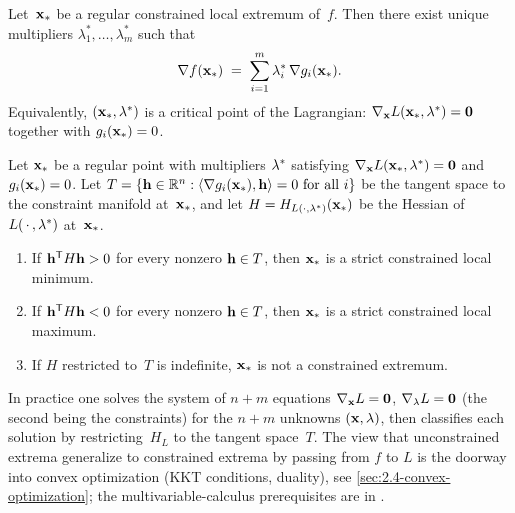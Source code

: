 \begin{theorem}
\label{thm:lagrange-necessary}
Let~$\mathbf{x}_*$ be a regular constrained local extremum of~$f$. Then
there exist unique multipliers $\lambda_1^*, \dots, \lambda_m^*$ such
that
\[
  \nabla f(\mathbf{x}_*) \;=\; \sum_{i=1}^{m} \lambda_i^*\, \nabla g_i(\mathbf{x}_*).
\]
Equivalently, $(\mathbf{x}_*, \mathbf{\lambda}^*)$ is a critical point of
the Lagrangian: $\nabla_{\mathbf{x}} L(\mathbf{x}_*, \mathbf{\lambda}^*) = \mathbf{0}$
together with $g_i(\mathbf{x}_*) = 0$.
\end{theorem}

\begin{theorem}
\label{thm:lagrange-sufficient}
Let $\mathbf{x}_*$ be a regular point with multipliers $\mathbf{\lambda}^*$
satisfying $\nabla_{\mathbf{x}} L(\mathbf{x}_*, \mathbf{\lambda}^*) = \mathbf{0}$
and $g_i(\mathbf{x}_*) = 0$. Let $T = \{\mathbf{h} \in \mathbb{R}^n : \langle \nabla g_i(\mathbf{x}_*), \mathbf{h} \rangle = 0
\text{ for all } i\}$ be the tangent space to the constraint manifold
at~$\mathbf{x}_*$, and let $H = H_{L(\cdot, \mathbf{\lambda}^*)}(\mathbf{x}_*)$
be the Hessian of $L(\,\cdot\,, \mathbf{\lambda}^*)$ at~$\mathbf{x}_*$.
\begin{enumerate}[label=(\alph*)]
  \item If $\mathbf{h}^{\mathsf{T}} H \mathbf{h} > 0$ for every nonzero $\mathbf{h} \in T$,
        then $\mathbf{x}_*$ is a strict constrained local minimum.
  \item If $\mathbf{h}^{\mathsf{T}} H \mathbf{h} < 0$ for every nonzero $\mathbf{h} \in T$,
        then $\mathbf{x}_*$ is a strict constrained local maximum.
  \item If $H$ restricted to~$T$ is indefinite, $\mathbf{x}_*$ is not a
        constrained extremum.
\end{enumerate}
\end{theorem}

\begin{remark}
In practice one solves the system of $n + m$ equations
$\nabla_{\mathbf{x}} L = \mathbf{0}$, $\nabla_{\mathbf{\lambda}} L = \mathbf{0}$
(the second being the constraints) for the $n + m$ unknowns
$(\mathbf{x}, \mathbf{\lambda})$, then classifies each solution by
restricting~$H_L$ to the tangent space~$T$. The view that
unconstrained extrema generalize to constrained extrema by passing
from $f$ to $L$ is the doorway into convex optimization (KKT
conditions, duality), see \cref{sec:2.4-convex-optimization}; the
multivariable-calculus prerequisites are in \cite{Zorich1981}.
\end{remark}

